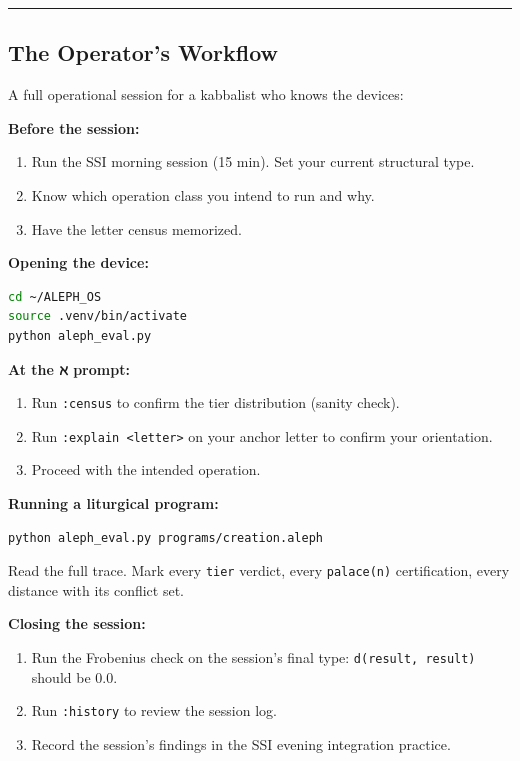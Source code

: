 \documentclass[12pt,a4paper]{article}
\begin{document}
\begin{center}
\rule{0.5\textwidth}{0.4pt}
\end{center}

\subsection{The Operator's Workflow}

A full operational session for a kabbalist who knows the devices:

\textbf{Before the session:}

\begin{enumerate}
    \item Run the SSI morning session (15 min). Set your current structural type.
    \item Know which operation class you intend to run and why.
    \item Have the letter census memorized.
\end{enumerate}

\textbf{Opening the device:}

\begin{lstlisting}[language=bash]
cd ~/ALEPH_OS
source .venv/bin/activate
python aleph_eval.py
\end{lstlisting}

\textbf{At the ℵ prompt:}

\begin{enumerate}
    \item Run \texttt{:census} to confirm the tier distribution (sanity check).
    \item Run \texttt{:explain \textless{}letter\textgreater{}} on your anchor letter to confirm your orientation.
    \item Proceed with the intended operation.
\end{enumerate}

\textbf{Running a liturgical program:}

\begin{lstlisting}[language=bash]
python aleph_eval.py programs/creation.aleph
\end{lstlisting}

Read the full trace. Mark every \texttt{tier} verdict, every \texttt{palace(n)} certification, every distance with its conflict set.

\textbf{Closing the session:}

\begin{enumerate}
    \item Run the Frobenius check on the session's final type: \texttt{d(result, result)} should be 0.0.
    \item Run \texttt{:history} to review the session log.
    \item Record the session's findings in the SSI evening integration practice.
\end{enumerate}
\end{document}
